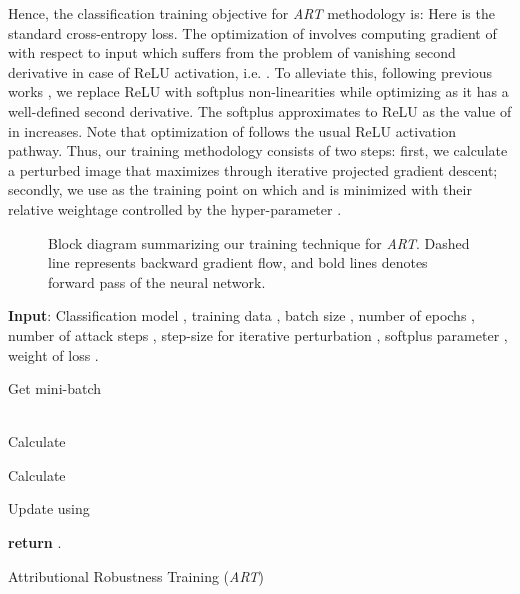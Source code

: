 \documentclass[runningheads]{llncs}
\begin{document}
Hence, the classification training objective for \textit{ART} methodology is:\label{eq:art}
Here  is the standard cross-entropy loss. The optimization of  involves computing gradient of  with respect to input  which suffers from the problem of vanishing second derivative in case of ReLU activation, i.e.   . To alleviate this, following previous works \cite{nips_sal,robust_attr_nips_sal}, we replace ReLU with softplus non-linearities while optimizing  as it has a well-defined second derivative. The softplus approximates to ReLU as the value of  in  increases. Note that optimization of  follows the usual ReLU activation pathway. Thus, our training methodology consists of two steps: first, we calculate a perturbed image  that maximizes  through iterative projected gradient descent; secondly, we use  as the training point on which  and  is minimized with their relative weightage controlled by the hyper-parameter .


\begin{figure}[t]
\centering
{}
\caption{\footnotesize{Block diagram summarizing our training technique for \textit{ART}. Dashed line represents  backward gradient flow, and bold lines denotes forward pass of the neural network.}}
\label{fig:block-diagram}
\end{figure}

\SetAlgoLined
\begin{algorithm}[!t]
\footnotesize
\textbf{Input}: Classification model , training data , batch size , number of epochs , number of attack steps , step-size for iterative perturbation , softplus parameter , weight of  loss . 
    
\For{}
    {   Get mini-batch \\
         \\
        


         
        
        Calculate  
        
        Calculate  


        
        


        Update  using 
    }
\textbf{return} .
\caption{\footnotesize{Attributional Robustness Training (\textit{ART}) }}
\label{train_sal}
\end{algorithm}
\end{document}
